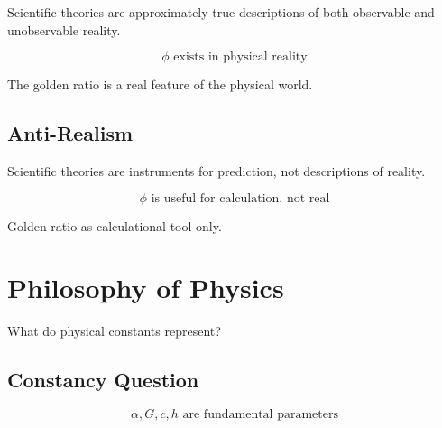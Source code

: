 \begin{definition}
\label{fa_31:def:realism}
Scientific theories are approximately true descriptions of both observable and unobservable reality.
\end{definition}

\begin{theorem}
\label{fa_31:thm:realist-golden}
\begin{equation}
\phi \text{ exists in physical reality}
\end{equation}

The golden ratio is a real feature of the physical world.
\end{theorem}

\subsection{Anti-Realism}

\begin{definition}
\label{fa_31:def:antirealism}
Scientific theories are instruments for prediction, not descriptions of reality.
\end{definition}

\begin{proposition}
\label{fa_31:prop:instrumental-golden}
\begin{equation}
\phi \text{ is useful for calculation, not real}
\end{equation}

Golden ratio as calculational tool only.
\end{proposition}

\section{Philosophy of Physics}

What do physical constants represent?

\subsection{Constancy Question}

\begin{definition}
\label{fa_31:def:constants}
\begin{equation}
\alpha, G, c, h \text{ are fundamental parameters}
\end{equation}
\end{definition}

